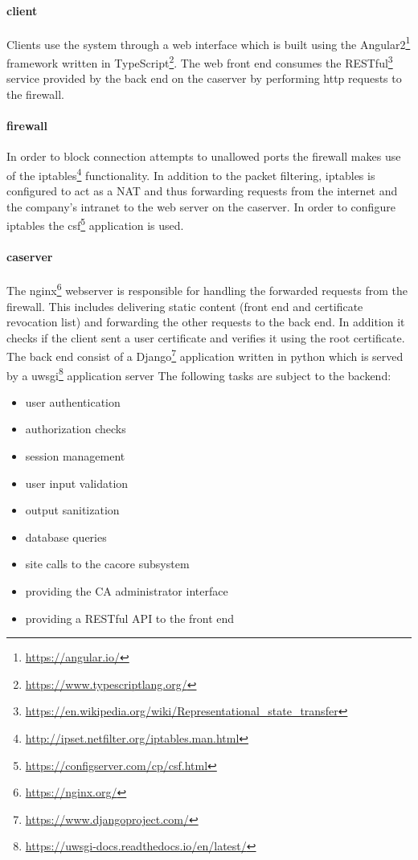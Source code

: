 \documentclass[english]{article}
\begin{document}
 \paragraph{client} 
 Clients use the system through a web interface which is built using the  Angular2\footnote{\url{https://angular.io/}} framework written in TypeScript\footnote{\url{https://www.typescriptlang.org/}}. The web front end consumes the RESTful\footnote{\label{restful}\url{https://en.wikipedia.org/wiki/Representational_state_transfer}} service provided by the back end on the caserver by performing http requests to the firewall. 
 
 \paragraph{firewall}
 In order to block connection attempts to unallowed ports the firewall makes use of the iptables\footnote{\url{http://ipset.netfilter.org/iptables.man.html}} functionality. In addition to the packet filtering, iptables is configured to act as a NAT and thus forwarding requests from the internet and the company's intranet to the web server on the caserver. In order to configure iptables the csf\footnote{\url{https://configserver.com/cp/csf.html}} application is used.
 
 \paragraph{caserver}
The nginx\footnote{\url{https://nginx.org/}} webserver is responsible for handling the forwarded requests from the firewall. This includes delivering static content (front end and certificate revocation list) and forwarding the other requests to the back end. In addition it checks if the client sent a user certificate and verifies it using the root certificate. \\The back end consist of a Django\footnote{\label{django}\url{https://www.djangoproject.com/}} application written in python which is served by a uwsgi\footnote{\url{https://uwsgi-docs.readthedocs.io/en/latest/}} application server  The following tasks are subject to the backend: 

\begin{itemize}
\item user authentication
\item authorization checks
\item session management
\item user input validation
\item output sanitization
\item database queries
\item site calls to the cacore subsystem
\item providing the CA administrator interface
\item providing a RESTful API to the front end
\end{itemize}
\end{document}
